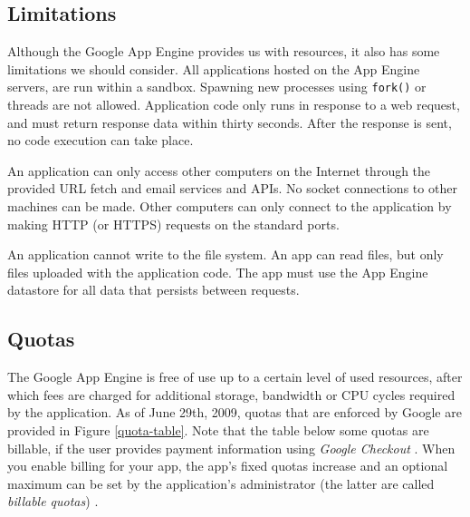 \subsection{Limitations}
Although the Google App Engine provides us with resources, it also has some
limitations we should consider. All applications hosted on the App Engine
servers, are run within a sandbox. Spawning new processes using \texttt{fork()}
or threads are not allowed. Application code only runs in response to a web
request, and must return response data within thirty seconds. After the response
is sent, no code execution can take place.

An application can only access other computers on the Internet through the
provided URL fetch and email services and APIs. No socket connections to other
machines can be made. Other computers can only connect to the application by
making HTTP (or HTTPS) requests on the standard ports.

An application cannot write to the file system. An app can read files, but only
files uploaded with the application code. The app must use the App Engine
datastore for all data that persists between requests.

\subsection{Quotas}
\label{appengine-quotas}
The Google App Engine is free of use up to a certain level of used resources,
after which fees are charged for additional storage, bandwidth or CPU cycles
required by the application. As of June 29th, 2009, quotas that are enforced by
Google are provided in Figure \ref{quota-table}. Note that the table below some
quotas are billable, if the user provides payment information using \emph{Google
Checkout} \cite{google-checkout-www}. When you enable billing for your app, the
app's fixed quotas increase and an optional maximum can be set by the
application's administrator (the latter are called \emph{billable quotas})
\cite{app-engine-quotas}.

